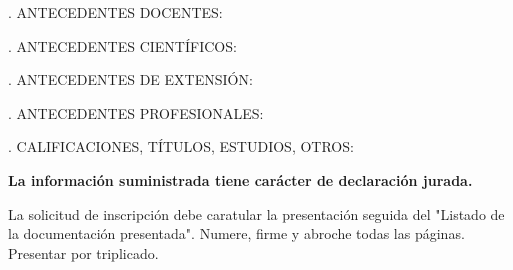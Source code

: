 \documentclass{article}
\begin{document}
\label{begin-docentes}
. ANTECEDENTES DOCENTES:

\bigskip
\noindent 
\label{end-docentes}

\bigskip

\label{begin-cientificos}
. ANTECEDENTES CIENT\'IFICOS:

\bigskip
\noindent 
\label{end-cientificos}

\bigskip

\label{begin-extension}
. ANTECEDENTES DE EXTENSI\'ON:

\bigskip
\noindent 
\label{end-extension}

\bigskip

\label{begin-profesionales}
. ANTECEDENTES PROFESIONALES:

\bigskip
\noindent 
\label{end-profesionales}

\bigskip

\label{begin-otros}
. CALIFICACIONES, T\'ITULOS, ESTUDIOS, OTROS:

\bigskip
\noindent 
\label{end-otros}

\vfill

\begin{center}
{\bf La informaci\'on suministrada tiene car\'acter de declaraci\'on jurada.

La solicitud de inscripci\'on debe caratular la presentaci\'on seguida del "Listado de la documentaci\'on presentada". Numere, firme y abroche todas las p\'aginas. Presentar por triplicado.}
\end{center}
\end{document}
